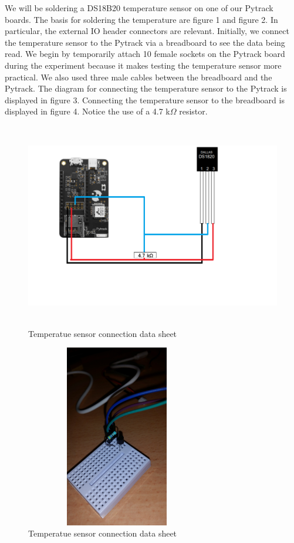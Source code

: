 		We will be soldering a DS18B20 temperature sensor on one of our Pytrack boards. The basis for soldering the temperature are figure 1 and figure 2. In particular, the external IO header connectors are relevant. Initially, we connect the temperature sensor to the Pytrack via a breadboard to see the data being read. We begin by temporarily attach 10 female sockets on the Pytrack board during the experiment because it makes testing the temperature sensor more practical. We also used three male cables between the breadboard and the Pytrack. The diagram for connecting the temperature sensor to the Pytrack is displayed in figure 3. Connecting the temperature sensor to the breadboard is displayed in figure 4. Notice the use of a 4.7 k$\Omega$ resistor.
		\begin{figure}[h]
			\caption{Temperatue sensor connection data sheet}
			\includegraphics[width=15cm, height=9cm]{pytracktempchart}
		\end{figure}
		\begin{figure}[h]
			\caption{Temperatue sensor connection data sheet}
			\includegraphics[width=8cm, height=8cm]{breadboard1}
		\end{figure}
